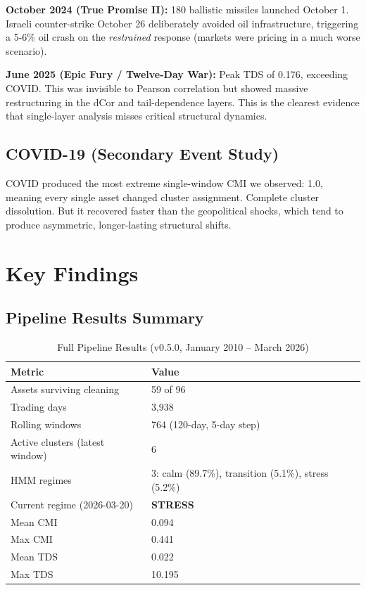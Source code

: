 \documentclass[12pt, letterpaper]{article}
\begin{document}
\textbf{October 2024 (True Promise II):} 180 ballistic missiles launched October 1. Israeli counter-strike October 26 deliberately avoided oil infrastructure, triggering a 5-6\% oil crash on the \textit{restrained} response (markets were pricing in a much worse scenario).

\textbf{June 2025 (Epic Fury / Twelve-Day War):} Peak TDS of 0.176, exceeding COVID. This was invisible to Pearson correlation but showed massive restructuring in the dCor and tail-dependence layers. This is the clearest evidence that single-layer analysis misses critical structural dynamics.

\subsection{COVID-19 (Secondary Event Study)}

COVID produced the most extreme single-window CMI we observed: 1.0, meaning every single asset changed cluster assignment. Complete cluster dissolution. But it recovered faster than the geopolitical shocks, which tend to produce asymmetric, longer-lasting structural shifts.

\section{Key Findings}

\subsection{Pipeline Results Summary}

\begin{table}[H]
\centering
\caption{Full Pipeline Results (v0.5.0, January 2010 -- March 2026)}
\begin{tabular}{@{}ll@{}}
\toprule
\textbf{Metric} & \textbf{Value} \\
\midrule
Assets surviving cleaning & 59 of 96 \\
Trading days & 3,938 \\
Rolling windows & 764 (120-day, 5-day step) \\
Active clusters (latest window) & 6 \\
HMM regimes & 3: calm (89.7\%), transition (5.1\%), stress (5.2\%) \\
Current regime (2026-03-20) & \textbf{STRESS} \\
Mean CMI & 0.094 \\
Max CMI & 0.441 \\
Mean TDS & 0.022 \\
Max TDS & 10.195 \\
\bottomrule
\end{tabular}
\end{table}
\end{document}
